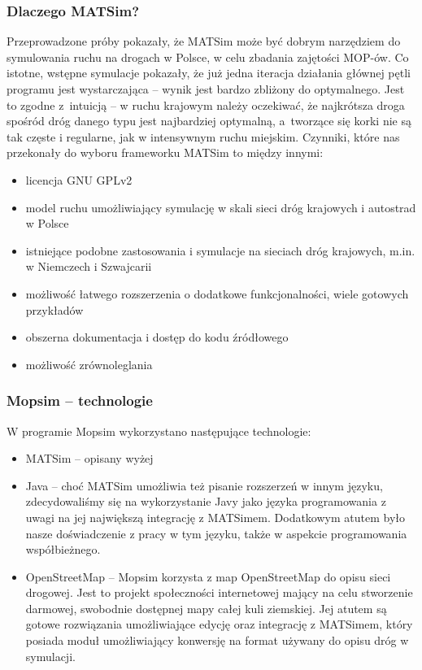 \subsubsection{Dlaczego MATSim?}
Przeprowadzone próby pokazały, że MATSim może być dobrym narzędziem do symulowania ruchu na drogach w Polsce, w celu zbadania zajętości MOP-ów. Co istotne, wstępne symulacje pokazały, że już jedna iteracja działania głównej pętli programu jest wystarczająca -- wynik jest bardzo zbliżony do optymalnego. Jest to zgodne z~intuicją -- w ruchu krajowym należy oczekiwać, że najkrótsza droga spośród dróg danego typu jest najbardziej optymalną, a~tworzące się korki nie są tak częste i regularne, jak w intensywnym ruchu miejskim. Czynniki, które nas przekonały do wyboru frameworku MATSim to między innymi:
\begin{itemize}
\item licencja GNU GPLv2
\item model ruchu umożliwiający symulację w skali sieci dróg krajowych i autostrad w Polsce
\item istniejące podobne zastosowania i symulacje na sieciach dróg krajowych, m.in. w Niemczech i Szwajcarii
\item możliwość łatwego rozszerzenia o dodatkowe funkcjonalności, wiele gotowych przykładów
\item obszerna dokumentacja i dostęp do kodu źródłowego
\item możliwość zrównoleglania
\end{itemize}

\subsubsection{Mopsim -- technologie}
W programie Mopsim wykorzystano następujące technologie:
\begin{itemize}
\item MATSim -- opisany wyżej
\item Java -- choć MATSim umożliwia też pisanie rozszerzeń w innym języku, zdecydowaliśmy się na wykorzystanie Javy jako języka programowania z uwagi na jej największą integrację z MATSimem. Dodatkowym atutem było nasze doświadczenie z pracy w tym języku, także w aspekcie programowania współbieżnego.
\item OpenStreetMap\cite{osm} -- Mopsim korzysta z map OpenStreetMap do opisu sieci drogowej. Jest to projekt społeczności internetowej mający na celu stworzenie darmowej, swobodnie dostępnej mapy całej kuli ziemskiej. Jej atutem są gotowe rozwiązania umożliwiające edycję oraz integrację z MATSimem, który posiada moduł umożliwiający konwersję na format używany do opisu dróg w symulacji.
\end{itemize}
